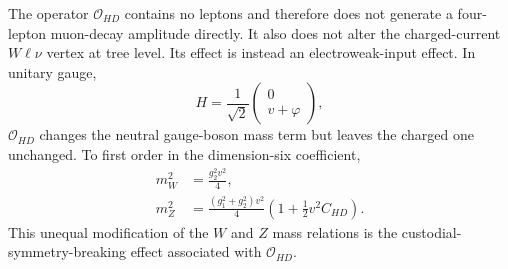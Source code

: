 The operator $\mathcal O_{HD}$ contains no leptons and therefore does not
generate a four-lepton muon-decay amplitude directly.  It also does not
alter the charged-current $W\ell\nu$ vertex at tree level.  Its effect is
instead an electroweak-input effect.  In unitary gauge,
\begin{equation}
    H=\frac{1}{\sqrt2}
      \begin{pmatrix}0\\ v+\varphi\end{pmatrix},
\end{equation}
$\mathcal O_{HD}$ changes the neutral gauge-boson mass term but leaves the
charged one unchanged.  To first order in the dimension-six coefficient,
\begin{align}
    m_W^2
    &=\frac{g_2^2v^2}{4},
    \\
    m_Z^2
    &=\frac{(g_1^2+g_2^2)v^2}{4}
      \left(1+\frac12v^2C_{HD}\right).
    \label{eq:chd-gauge-boson-masses}
\end{align}
This unequal modification of the $W$ and $Z$ mass relations is the
custodial-symmetry-breaking effect associated with $\mathcal O_{HD}$.

